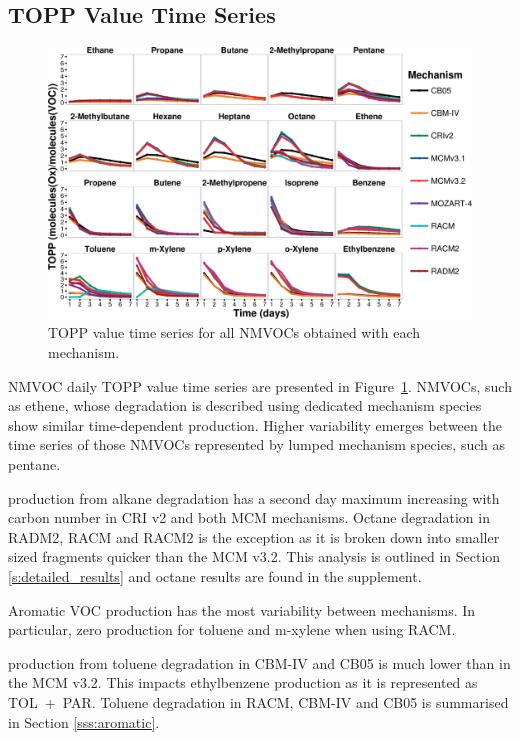 \subsection{TOPP Value Time Series} \label{ss:profiles} %

\begin{figure}
    \centering
    \includegraphics[width=\textwidth]{img/TOPP_daily_values_all_species}
    \vspace{0mm}
    \caption{TOPP value time series for all NMVOCs obtained with each mechanism.}
    \vspace{-4mm}
    \label{f:TOPP_dailies}
\end{figure}

NMVOC daily TOPP value time series are presented in \mbox{Figure \ref{f:TOPP_dailies}}. 
NMVOCs, such as ethene, whose degradation is described using dedicated mechanism species show similar time-dependent  production.
Higher variability emerges between the time series of those NMVOCs represented by lumped mechanism species, such as pentane.

 production from alkane degradation has a second day maximum increasing with carbon number in CRI v2 and both MCM mechanisms.
Octane degradation in RADM2, RACM and RACM2 is the exception as it is broken down into smaller sized fragments quicker than the MCM v3.2.
This analysis is outlined in Section \ref{s:detailed_results} and octane results are found in the supplement.

Aromatic VOC  production has the most variability between mechanisms. 
In particular, zero  production for toluene and m-xylene when using RACM.

 production from toluene degradation in CBM-IV and CB05 is much lower than in the MCM v3.2.
This impacts ethylbenzene  production as it is represented as \mbox{TOL + PAR}. 
Toluene degradation in RACM, CBM-IV and CB05 is summarised in Section \ref{sss:aromatic}.  


